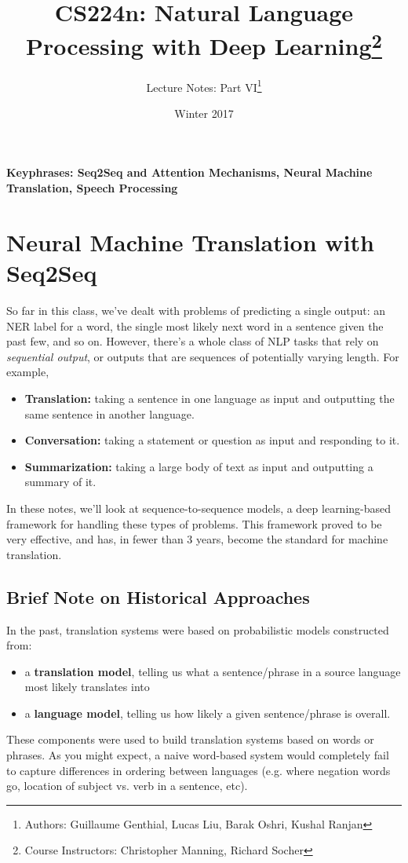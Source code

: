 \documentclass{tufte-handout}
\title{CS224n: Natural Language Processing with Deep Learning\thanks{Course Instructors: Christopher Manning, Richard Socher}}
\author[]{Lecture Notes: Part VI\thanks{Authors: Guillaume Genthial, Lucas Liu, Barak Oshri, Kushal Ranjan}}
\date{Winter 2017} %
\begin{document}
\maketitle%


\textbf{Keyphrases: Seq2Seq and Attention Mechanisms, Neural Machine Translation, Speech Processing}
\section{Neural Machine Translation with Seq2Seq}
So far in this class, we've dealt with problems of predicting a single output: an NER label for a word, the single most likely next word in a sentence given the past few, and so on. However, there's a whole class of NLP tasks that rely on \textit{sequential output}, or outputs that are sequences of potentially varying length. For example,
\begin{itemize}
\item \textbf{Translation:} taking a sentence in one language as input and outputting the same sentence in another language.
\item \textbf{Conversation:} taking a statement or question as input and responding to it.
\item \textbf{Summarization:} taking a large body of text as input and outputting a summary of it.
\end{itemize}
In these notes, we'll look at sequence-to-sequence models, a deep learning-based framework for handling these types of problems. This framework proved to be very effective, and has, in fewer than 3 years, become the standard for machine translation.

\subsection{Brief Note on Historical Approaches}
In the past, translation systems were based on probabilistic models constructed from:
\begin{itemize}
\item a \textbf{translation model}, telling us what a sentence/phrase in a source language most likely translates into
\item a \textbf{language model}, telling us how likely a given sentence/phrase is overall.
\end{itemize}
These components were used to build translation systems based on words or phrases. As you might expect, a naive word-based system would completely fail to capture differences in ordering between languages (e.g. where negation words go, location of subject vs. verb in a sentence, etc).
\end{document}

